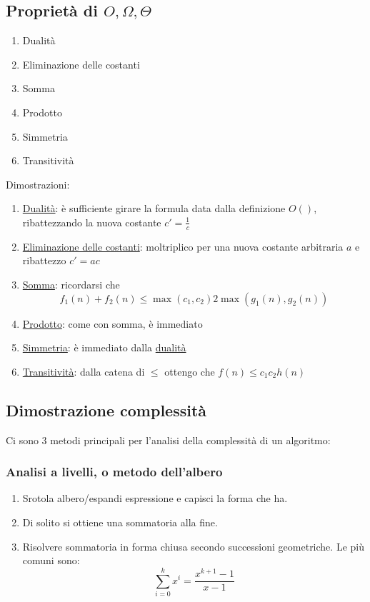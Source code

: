 \subsection{Proprietà di {$ O, \Omega , \Theta  $}}
\begin{enumerate}
	\item Dualità \label{dualità}
	\item Eliminazione delle costanti \label{eliminazione}
	\item Somma \label{somma}
	\item Prodotto \label{prodotto}
	\item Simmetria \label{simmetria}
	\item Transitività \label{transitività}
\end{enumerate}
Dimostrazioni:
\begin{enumerate}
	\item \hyperref[dualità]{Dualità}: è sufficiente girare la formula data dalla definizione  $ O\left(\right) $, ribattezzando la nuova costante $ c' = \frac{1}{c} $
	\item \hyperref[eliminazione]{Eliminazione delle costanti}: moltriplico per una nuova costante arbitraria $ a $ e ribattezzo $ c' = ac  $
	\item \hyperref[somma]{Somma}: ricordarsi che
	      \[
		      f_1\left(n\right) + f_2\left(n\right) \le \operatorname{max} \left(c_1, c_2\right) 2 \operatorname{max} \left(g_1\left(n\right), g_2\left(n\right)\right)
	      \]
	\item \hyperref[prodotto]{Prodotto}: come con somma, è immediato
	\item \hyperref[simmetria]{Simmetria}: è immediato dalla \hyperref[dualità]{dualità}
	\item \hyperref[transitività]{Transitività}: dalla catena di $ \le $ ottengo che $ f\left(n\right) \le c_1 c_2 h\left(n\right) $
\end{enumerate}


\subsection{Dimostrazione complessità}
Ci sono 3 metodi principali per l'analisi della complessità di un algoritmo:

\subsubsection{Analisi a livelli, o metodo dell'albero}\label{complessita per sostituzione}
\begin{enumerate}
	\item Srotola albero/espandi espressione e capisci la forma che ha.
	\item Di solito si ottiene una sommatoria alla fine.
	\item Risolvere sommatoria in forma chiusa secondo successioni geometriche. Le più comuni sono:
	      \begin{equation}
		      \sum_{i=0}^{k} x^{i} = \frac{x^{k+1} - 1}{x - 1}
	      \end{equation}\label{somma potenze}
\end{enumerate}


